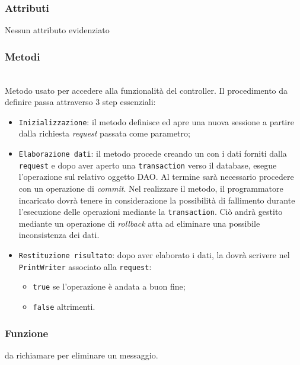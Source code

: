 \subsubsection*{Attributi}

Nessun attributo evidenziato

\subsubsection*{Metodi}
\begin{description}
	
	\item{}\\
	Metodo usato per accedere alla funzionalità del controller. Il procedimento da definire passa attraverso 3 step essenziali:
	\begin{itemize}
		\item \texttt{Inizializzazione}: il metodo definisce ed apre una nuova sessione a partire dalla richiesta \textit{request} passata come parametro;
		\item \texttt{Elaborazione dati}: il metodo procede creando un  con i dati forniti dalla \texttt{request} e dopo aver aperto una \texttt{transaction} verso il database, esegue l'operazione  sul relativo oggetto DAO. Al termine sarà necessario procedere con un operazione di \textit{commit}. Nel realizzare il metodo, il programmatore incaricato dovrà tenere in considerazione la possibilità di fallimento durante l'esecuzione delle operazioni mediante la \texttt{transaction}. Ciò andrà gestito mediante un operazione di \textit{rollback} atta ad eliminare una possibile inconsistenza dei dati.
		\item \texttt{Restituzione risultato}: dopo aver elaborato i dati, la  dovrà scrivere nel \texttt{PrintWriter} associato alla \texttt{request}:
			\begin{itemize}
				\item \texttt{true} se l'operazione è andata a buon fine;
				\item \texttt{false} altrimenti.
			\end{itemize}
	\end{itemize}

\end{description}


\subsubsection*{Funzione}
 da richiamare per eliminare un messaggio.

